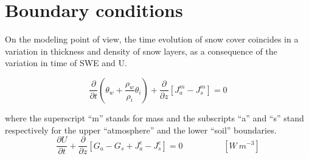 








\section{Boundary conditions}

On the modeling point of view, the time evolution of snow cover coincides in a variation in thickness and density of snow layers, as a consequence of the variation in time of SWE and U.






\begin{equation}
\frac{\partial}{\partial t} \left( \theta_w + \frac{\rho_w}{\rho_i} \theta_i \right)+ \frac{\partial}{\partial z} \left[J_a^m - J_s^m \right] =0
\end{equation}

where the superscript ``m'' stands for mass and the subscripts ``a'' and ``s'' stand respectively for the upper ``atmosphere'' and the lower ``soil'' boundaries.
\begin{equation}\label{Eq:cons_en}
\frac{\partial U}{\partial t} + \frac{\partial }{\partial z} \left[ G_a - G_s + J_a^e - J_s^e\right]=0  \hspace{2cm} [W \ m^{-3}]
\end{equation}
%




